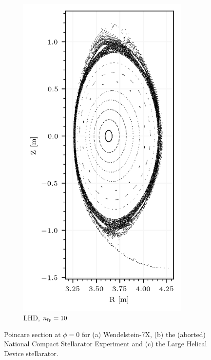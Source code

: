 \begin{figure}[H]
    \hfill
    \begin{subfigure}[c]{0.32\textwidth}
        \centering
        \includegraphics[width=0.94\textwidth]{images/theory/lhd.png}
        \caption{LHD, $n_\text{fp} = 10$}
        \label{fig:lhd-default}
    \end{subfigure}
    \caption{Poincare section at $\phi = 0$ for (a) Wendelstein-7X, (b) the (aborted) National Compact Stellarator Experiment and (c) the Large Helical Device stellarator.}
    \label{fig:poincare-example}
\end{figure}

